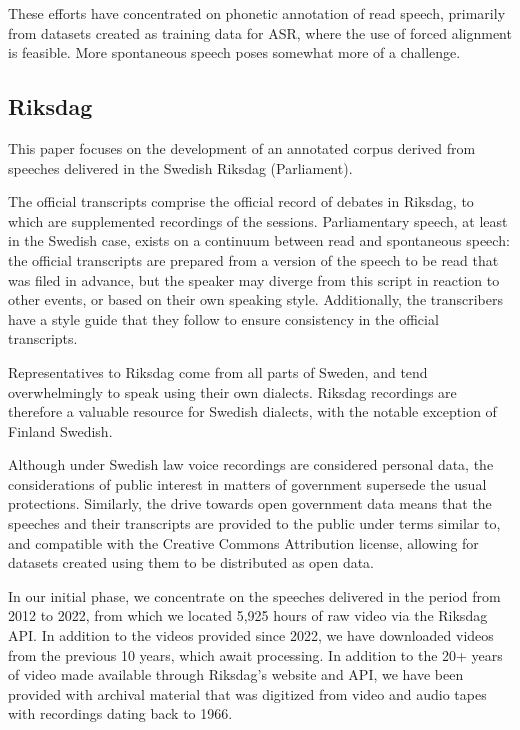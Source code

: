 \documentclass{Interspeech}
\begin{document}
These efforts have concentrated on phonetic annotation of read speech, primarily from datasets created as training data for ASR, where the use of forced alignment is feasible. More spontaneous speech poses somewhat more of a challenge.

\subsection{Riksdag}

This paper focuses on the development of an annotated corpus derived from speeches delivered in the Swedish Riksdag (Parliament).

The official transcripts comprise the official record of debates in Riksdag, to which are supplemented recordings of the sessions.
Parliamentary speech, at least in the Swedish case, exists on a continuum between read and spontaneous speech: the official transcripts are prepared from a version of the speech to be read that was filed in advance, but the speaker may diverge from this script in reaction to other events, or based on their own speaking style. Additionally, the transcribers have a style guide that they follow to ensure consistency in the official transcripts.

Representatives to Riksdag come from all parts of Sweden, and tend overwhelmingly to speak using their own dialects. Riksdag recordings are therefore a valuable resource for Swedish dialects, with the notable exception of Finland Swedish.

Although under Swedish law voice recordings are considered personal data, the considerations of public interest in matters of government supersede the usual protections. Similarly, the drive towards open government data means that the speeches and their transcripts are provided to the public under terms similar to, and compatible with the Creative Commons Attribution license, allowing for datasets created using them to be distributed as open data.

In our initial phase, we concentrate on the speeches delivered in the period from 2012 to 2022, from which we located 5,925 hours of raw video via the Riksdag API. In addition to the videos provided since 2022, we have downloaded videos from the previous 10 years, which await processing. In addition to the 20+ years of video made available through Riksdag's website and API, we have been provided with archival material that was digitized from video and audio tapes with recordings dating back to 1966.
\end{document}
